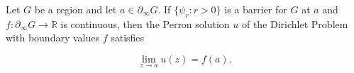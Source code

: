 Let $G$ be a region and let $a \in \partial_\infty G$. If $\{\psi_r: r > 0\}$ is a barrier for $G$ at $a$ and $f: \partial_\infty G \to \mathbb{R}$ is continuous, then the Perron solution $u$ of the Dirichlet Problem with boundary values $f$ satisfies

$$\lim_{z \to a} u(z) = f(a).$$
